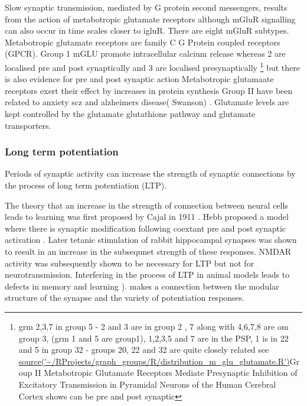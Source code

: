 Slow synaptic transmission, mediated by G protein second messengers, results from the action of metabotropic glutamate receptors \cite{niswender2010metabotropic} although mGluR signalling can also occur in time scales closer to igluR. There are eight mGluR subtypes. Metabotropic glutamate receptors are family C G Protein coupled receptors (GPCR). Group 1 mGLU promote intracellular calcium release whereas 2 are localised pre and post synaptically  and 3 are localised presynaptically \cite{niswender2010metabotropic} \footnote{grm 2,3,7 in group 5 - 2 and 3 are in group 2 , 7 along with 4,6,7,8 are om group 3, (grm 1 and 5 are group1), 1,2,3,5 and 7 are in the PSP, 1 is in 22 and 5 in group 32 - groups 20, 22 and 32 are quite closely related see \url{ source('~/RProjects/graph_groups/R/distribution_m_glu_glutamate.R')}Group II Metabotropic Glutamate Receptors Mediate Presynaptic Inhibition of Excitatory Transmission in Pyramidal Neurons of the Human Cerebral Cortex shows can be pre and post synaptic } but there is also evidence for pre and post synaptic action 
Metabotropic glutamaate receptors exert their effect by increases in protein synthesis Group II have been related to anxiety scz and alzheimers disease( Swanson) .
Glutamate levels are kept controlled by the glutamate glutathione pathway and glutamate transporters. 

\subsubsection{Long term potentiation}
Periods of synaptic activity can increase the strength of synaptic connections by the process of long term potentiation (LTP).

The theory that an increase in the strength of connection between neural cells leads to learning was first proposed by Cajal in 1911 \cite{nicoll2017brief}. Hebb proposed a model where there is synaptic modification following coextant pre and post synaptic activation \cite{hebb1949organization_check}. Later tetanic stimulation of rabbit hippocampal synapses was shown to result in an increase in the subsequnet strength of these responses.\cite{bliss1973long} NMDAR activity was subsequently shown to be necessary for LTP \cite{collingridge1983excitatory} but not for neurotransmission. 
 Interfering in the process of LTP in animal models leads to defects in memory and learning \cite{lisman2012mechanisms}).
 \cite{lisman2017glutamatergic} makes a connection between the modular structure of the synapse and the variety of potentiation responses.
 
